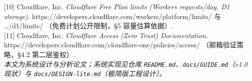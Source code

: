 \documentclass[10pt,a4paper]{article}
\begin{document}
[10] Cloudflare, Inc. \textit{Cloudflare Free Plan limits (Workers requests/day, D1 storage)}. https://developers.cloudflare.com/workers/platform/limits/ 与 \ldots/d1/limits/ （免费计划公开限制，§5 容量估算依据）.\\[0.4em]
[11] Cloudflare, Inc. \textit{Cloudflare Access (Zero Trust) Documentation}. https://developers.cloudflare.com/cloudflare-one/policies/access/ （邮箱验证策略，§4.2 第二层鉴权）.\\[1em]
\noindent\itshape 本文为系统设计与分析论文；系统实现见仓库 \texttt{README.md}、\texttt{docs/GUIDE.md}（v1.0 现状）与 \texttt{docs/DESIGN-lite.md}（极简版工程设计）。
\end{document}
